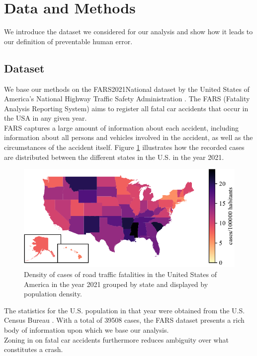 \documentclass{article}
\theoremstyle{plain}
\theoremstyle{definition}
\theoremstyle{remark}
\begin{document}

\section{Data and Methods}\label{sec:methods}
We introduce the dataset we considered for our analysis and show how it leads to our definition of preventable human error.


\subsection{Dataset}
We base our methods on the FARS2021National dataset by the United States of America's National Highway Traffic Safety Administration \cite{fars}. The FARS (Fatality Analysis Reporting System) aims to register all fatal car accidents that occur in the USA in any given year.
\\
FARS captures a large amount of information about each accident, including information about all persons and vehicles involved in the accident, as well as the circumstances of the accident itself. Figure \ref{fig:cases-fars} illustrates how the recorded cases are distributed between the different states in the U.S. in the year 2021.
\begin{figure}[ht]
	\vskip 0.2in
	\begin{center}
		\includegraphics[width = \columnwidth]{plots/cases-fars}
		\caption{Density of cases of road traffic fatalities in the United States of America in the year 2021 grouped by state and displayed by population density.}
		\label{fig:cases-fars}
	\end{center}
	\vskip -0.2in
\end{figure}
The statistics for the U.S. population in that year were obtained from the U.S. Census Bureau \cite{census}. With a total of 39508 cases, the FARS dataset presents a rich body of information upon which we base our analysis.
\\
Zoning in on fatal car accidents furthermore reduces ambiguity over what constitutes a crash.
\end{document}
